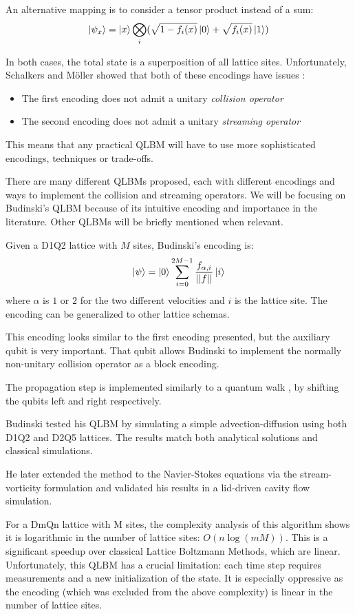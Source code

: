 An alternative mapping is to consider a tensor product instead of a sum:
\begin{displaymath}
    \label{eq:qlbm2}
    \ket{\psi_x} = \ket{x}\bigotimes_{i} (\sqrt{1-f_i(x)}\ket{0} + \sqrt{f_i(x)}\ket{1})
\end{displaymath}

In both cases, the total state is a superposition of all lattice sites.
Unfortunately, Schalkers and Möller showed that both of these encodings have issues \cite{schalkers2024importance}:
\begin{itemize}
    \item The first encoding does not admit a unitary \emph{collision operator}
    \item The second encoding does not admit a unitary \emph{streaming operator}
\end{itemize}

This means that any practical QLBM will have to use more sophisticated encodings, techniques or trade-offs.

There are many different QLBMs proposed, each with different encodings and ways to implement the collision and streaming operators.
We will be focusing on Budinski's QLBM \cite{budinski2021quantum} because of its intuitive encoding and importance in the literature.
Other QLBMs will be briefly mentioned when relevant.

Given a D1Q2 lattice with $M$ sites, Budinski's encoding is:
\begin{displaymath}
    \label{eq:qlbm3}
    \ket{\psi} = \ket{0} \sum_{i=0}^{2M-1} \frac{f_{\alpha, i}}{||f||}\ket{i}
\end{displaymath}
where $\alpha$ is $1$ or $2$ for the two different velocities and $i$ is the lattice site.
The encoding can be generalized to other lattice schemas.

This encoding looks similar to the first encoding presented, but the auxiliary qubit is very important.
That qubit allows Budinski to implement the normally non-unitary collision operator as a block encoding.

The propagation step is implemented similarly to a quantum walk \cite{childs2009universal}, by shifting the qubits left and right respectively.

Budinski tested his QLBM by simulating a simple advection-diffusion using both D1Q2 and D2Q5 lattices.
The results match both analytical solutions and classical simulations.

He later extended the method to the Navier-Stokes equations \cite{ljubomir2022quantum} via the stream-vorticity formulation and validated his results in a lid-driven cavity flow simulation.

For a DmQn lattice with M sites, the complexity analysis of this algorithm shows it is logarithmic in the number of lattice sites: $O(n\log(mM))$. This is a significant speedup over classical Lattice Boltzmann Methods, which are linear.
Unfortunately, this QLBM has a crucial limitation: each time step requires measurements and a new initialization of the state.
It is especially oppressive as the encoding (which was excluded from the above complexity) is linear in the number of lattice sites.
